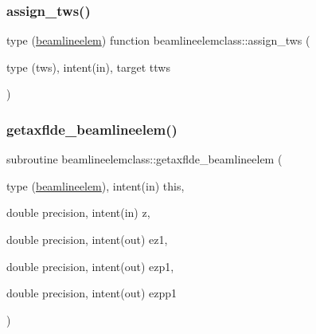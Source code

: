 \mbox{\label{namespacebeamlineelemclass_a097831d1513c1bbd70e5f97dea56fcd4}} 
\subsubsection{\texorpdfstring{assign\_tws()}{assign\_tws()}}
{\footnotesize\ttfamily type (\mbox{\hyperlink{namespacebeamlineelemclass_structbeamlineelemclass_1_1beamlineelem}{beamlineelem}}) function beamlineelemclass\+::assign\+\_\+tws (\begin{DoxyParamCaption}\item[{type (tws), intent(in), target}]{ttws }\end{DoxyParamCaption})}

\mbox{\label{namespacebeamlineelemclass_aa38d23f41bd5b34e31e784e1bb1b4ba2}} 
\subsubsection{\texorpdfstring{getaxflde\_beamlineelem()}{getaxflde\_beamlineelem()}}
{\footnotesize\ttfamily subroutine beamlineelemclass\+::getaxflde\+\_\+beamlineelem (\begin{DoxyParamCaption}\item[{type (\mbox{\hyperlink{namespacebeamlineelemclass_structbeamlineelemclass_1_1beamlineelem}{beamlineelem}}), intent(in)}]{this,  }\item[{double precision, intent(in)}]{z,  }\item[{double precision, intent(out)}]{ez1,  }\item[{double precision, intent(out)}]{ezp1,  }\item[{double precision, intent(out)}]{ezpp1 }\end{DoxyParamCaption})}

